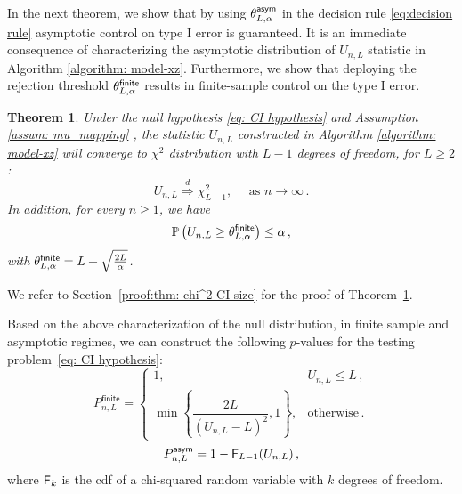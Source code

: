 \documentclass[11pt]{article}
\newtheorem{thm}[propo]{Theorem}
\begin{document}
In the next theorem, we show that by using $\theta_{L,\alpha}^{\mathsf{asym}}$ in the decision rule \eqref{eq:decision rule} asymptotic control on type I error is guaranteed. It is an immediate consequence of characterizing the asymptotic distribution of $U_{n,L}$ statistic in Algorithm \ref{algorithm: model-xz}. Furthermore,  we show that deploying the rejection threshold  $\theta_{L,\alpha}^{\mathsf{finite}}$ results in finite-sample control on the type I error.  
 \begin{thm}\label{thm: chi^2-CI-size}
 	Under the null hypothesis \eqref{eq: CI hypothesis} and Assumption \eqref{assum: mu_mapping} , the statistic $U_{n,L}$ constructed in Algorithm \ref{algorithm: model-xz} will converge to $\chi^2$ distribution with $L-1$ degrees of freedom, for $L\ge 2$: 
 	\[
 	U_{n,L}\overset{d}{\Rightarrow} \chi^2_{L-1}, \quad\text{ as }n\rightarrow\infty\,.
 	\] 
 In addition, for every $n\ge 1$, we have 
 \[
 {\mathbb P}\left( U_{n,L} \geq \theta_{L,\alpha}^{\mathsf{finite}} \right) \leq \alpha\,,
 \]
 with $\theta_{L,\alpha}^{\mathsf{finite}}=L+\sqrt{\frac{2L}{\alpha}}$.
\end{thm} 
We refer to Section~\ref{proof:thm: chi^2-CI-size} for the proof of Theorem~\ref{thm: chi^2-CI-size}.


Based on the above characterization of the null distribution, in finite sample and asymptotic regimes, we can construct the following $p$-values for the testing problem~\eqref{eq: CI hypothesis}:
%
\begin{equation}\label{eq: p-val}
P^{\mathsf{finite}}_{n,L}=\begin{cases}
	1,& U_{n,L} \leq L\,,\\
	\min\left\{\dfrac{2L}{(U_{n,L}-L)^2},1 \right\},&\text{otherwise}\,.
\end{cases}
\end{equation}
\begin{equation}\label{eq: p-val-asymptotic}
P^{\mathsf{asym}}_{n,L} =1-{\sf F}_{L-1}(U_{n,L})\,,
\end{equation}
%
where ${\sf F}_k$ is the cdf of a chi-squared random variable with $k$ degrees of freedom.
\end{document}

